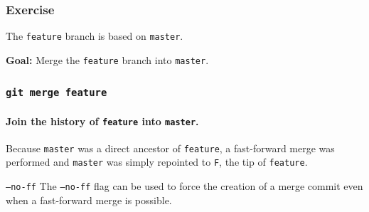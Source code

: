 \documentclass{beamer}
\newcommand\gitcmd[1]{\texttt{git #1}}
\newcommand\gflag[1]{\texttt{#1}}
\newcommand\grefspec[1]{\texttt{#1}}
\newcommand\gbranch[1]{\texttt{#1}}
\newcommand\goal[1]{\textbf{Goal:} #1}
\begin{document}
\begin{frame}
  \frametitle{Exercise}

  The \gbranch{feature} branch is based on \gbranch{master}.

  \goal{Merge the \gbranch{feature} branch into \gbranch{master}.}
  
  \begin{figure}
    \centering
  \end{figure}
\end{frame}

\begin{frame}
  \frametitle{\gitcmd{merge feature}}
  \framesubtitle{Join the history of \gbranch{feature} into \gbranch{master}.}
  
  \begin{figure}
    \centering
  \end{figure}

  Because \gbranch{master} was a direct ancestor of \gbranch{feature}, a fast-forward merge was performed and \gbranch{master} was simply repointed to \grefspec{F}, the tip of \gbranch{feature}.
  \vfill
  \begin{block}{\gflag{--no-ff}}
    The \gflag{--no-ff} flag can be used to force the creation of a merge commit even when a fast-forward merge is possible.
  \end{block}
\end{frame}
\end{document}
